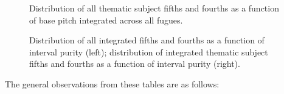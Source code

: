 \begin{figure}[H]
\vspace{1.5em}
    \centering
    \caption{Distribution of all thematic subject fifths and fourths as a function of base pitch integrated across all fugues. }
\end{figure}

\begin{figure}[H]
\vspace{1.5em}
    \centering
    \caption[Distribution of fifths and fourths as a function of interval purity, all intervals vs. thematic subject intervals. ]{Distribution of all integrated fifths and fourths as a function of interval purity (left); distribution of integrated thematic subject fifths and fourths as a function of interval purity (right).}
\end{figure}    The general observations from these tables are as follows:

